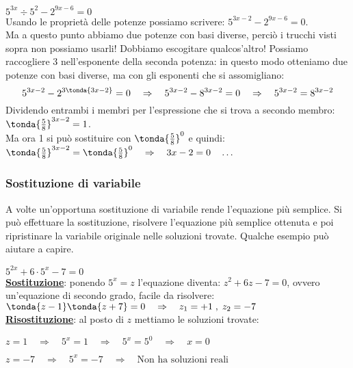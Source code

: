 \begin{esempio}
\({5}^{3x} \div 5^2-{2}^{9x-6}=0\)\\[4pt]
Usando le proprietà delle potenze possiamo scrivere: \({5}^{3x-2}-{2}^{9x-6}=0\).\\
Ma a questo punto abbiamo due potenze con basi diverse, perciò i trucchi visti sopra 
non possiamo usarli! Dobbiamo escogitare qualcos'altro! Possiamo 
raccogliere 3 nell'esponente della seconda potenza: in questo modo otteniamo due 
potenze con basi diverse, ma con gli esponenti che si assomigliano:
\[{5}^{3x-2}-{2}^{3\tonda{3x-2}}=0 \quad \Rightarrow \quad {5}^{3x-2}-{8}^{3x-2}=0 \quad 
\Rightarrow \quad {5}^{3x-2}={8}^{3x-2}\]
Dividendo entrambi i membri per l'espressione che si trova a secondo membro:
\(\tonda{\frac{5}{8}}^{3x-2}=1\).\\
Ma ora 1 si può sostituire con \(\tonda{\frac{5}{8}}^{0}\) e quindi:
\(\tonda{\frac{5}{8}}^{3x-2}=\tonda{\frac{5}{8}}^{0} \quad\Rightarrow\quad 3x-2=0 \quad\dots\)
\end{esempio}

\subsubsection{Sostituzione di variabile}
\label{subsubsec:esplog_sostituzione}

A volte un'opportuna sostituzione di variabile rende l'equazione più semplice. 
Si può effettuare la sostituzione, risolvere l'equazione più semplice ottenuta e 
poi ripristinare la variabile originale nelle soluzioni trovate. Qualche esempio può aiutare a capire.

\begin{esempio} 
\(5^{2x} +6 \cdot 5^x -7=0\) \\[4pt]
\textbf{\underline{Sostituzione}}:
ponendo \(5^x=z\) l'equazione diventa: \(z^2 +6z -7=0\), ovvero un'equazione di secondo grado, facile da risolvere:
\(\tonda{z-1} \tonda{z+7}=0 \quad \Rightarrow \quad z_1=+1 \;,\; z_2=-7\) 
 \\[4pt]
\textbf{\underline{Risostituzione}}: al posto di \(z\) mettiamo le soluzioni trovate:

\(z = 1\quad \Rightarrow \quad 5^x=1 \quad \Rightarrow \quad 5^x=5^0\quad \Rightarrow \quad x=0\)

\(z = -7 \quad \Rightarrow \quad 5^x=-7 \quad \Rightarrow \quad \text{Non ha soluzioni reali}\)
\end{esempio}

